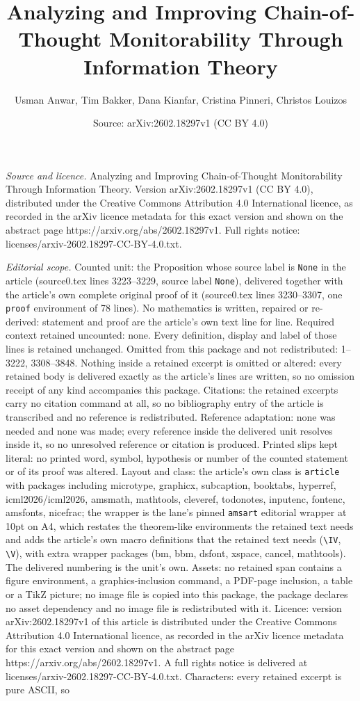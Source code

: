 \documentclass[10pt,a4paper]{amsart}
\title[Analyzing and Improving Chain-of-Thought Monitorability Thro]{Analyzing and Improving Chain-of-Thought Monitorability Through Information Theory}
\author{Usman Anwar, Tim Bakker, Dana Kianfar, Cristina Pinneri, Christos Louizos}
\date{Source: arXiv:2602.18297v1 (CC BY 4.0)}
\begin{document}
\maketitle

\noindent\emph{Source and licence.} Analyzing and Improving Chain-of-Thought Monitorability Through Information Theory. Version arXiv:2602.18297v1 (CC BY 4.0), distributed under the Creative Commons Attribution 4.0 International licence, as recorded in the arXiv licence metadata for this exact version and shown on the abstract page https://arxiv.org/abs/2602.18297v1. Full rights notice: licenses/arxiv-2602.18297-CC-BY-4.0.txt.\par\smallskip

\noindent\textit{Editorial scope.} Counted unit: the Proposition whose source label is \texttt{None} in the article (source0.tex lines 3223--3229, source label \texttt{None}), delivered together with the article's own complete original proof of it (source0.tex lines 3230--3307, one \texttt{proof} environment of 78 lines). No mathematics is written, repaired or re-derived: statement and proof are the article's own text line for line. Required context retained uncounted: none. Every definition, display and label of those lines is retained unchanged. Omitted from this package and not redistributed: 1--3222, 3308--3848. Nothing inside a retained excerpt is omitted or altered: every retained body is delivered exactly as the article's lines are written, so no omission receipt of any kind accompanies this package. Citations: the retained excerpts carry no citation command at all, so no bibliography entry of the article is transcribed and no reference is redistributed. Reference adaptation: none was needed and none was made; every reference inside the delivered unit resolves inside it, so no unresolved reference or citation is produced. Printed slips kept literal: no printed word, symbol, hypothesis or number of the counted statement or of its proof was altered. Layout and class: the article's own class is \texttt{article} with packages including microtype, graphicx, subcaption, booktabs, hyperref, icml2026/icml2026, amsmath, mathtools, cleveref, todonotes, inputenc, fontenc, amsfonts, nicefrac; the wrapper is the lane's pinned \texttt{amsart} editorial wrapper at 10pt on A4, which restates the theorem-like environments the retained text needs and adds the article's own macro definitions that the retained text needs (\texttt{\textbackslash IV}, \texttt{\textbackslash V}), with extra wrapper packages (bm, bbm, dsfont, xspace, cancel, mathtools). The delivered numbering is the unit's own. Assets: no retained span contains a figure environment, a graphics-inclusion command, a PDF-page inclusion, a table or a TikZ picture; no image file is copied into this package, the package declares no asset dependency and no image file is redistributed with it. Licence: version arXiv:2602.18297v1 of this article is distributed under the Creative Commons Attribution 4.0 International licence, as recorded in the arXiv licence metadata for this exact version and shown on the abstract page https://arxiv.org/abs/2602.18297v1. A full rights notice is delivered at licenses/arxiv-2602.18297-CC-BY-4.0.txt. Characters: every retained excerpt is pure ASCII, so 
\end{document}
